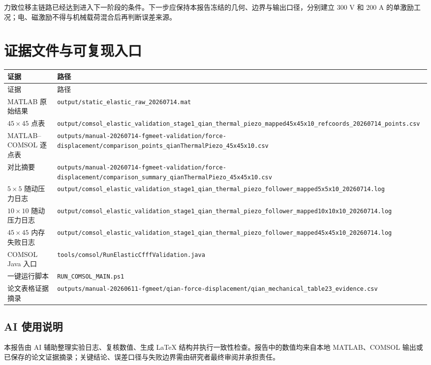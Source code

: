 \documentclass[UTF8,fontset=windows,12pt,a4paper]{ctexart}
\begin{document}
力致位移主链路已经达到进入下一阶段的条件。下一步应保持本报告冻结的几何、边界与输出口径，分别建立 300 V 和 200 A 的单激励工况；电、磁激励不得与机械载荷混合后再判断误差来源。

\section{证据文件与可复现入口}

\begin{longtable}{>{\raggedright\arraybackslash}p{}>{\raggedright\arraybackslash}p{}}
\toprule
证据 & 路径 \\
\midrule
\endfirsthead
\toprule
证据 & 路径 \\
\midrule
\endhead
MATLAB 原始结果 & \nolinkurl{output/static_elastic_raw_20260714.mat} \\
$45\times45$ 点表 & \nolinkurl{output/comsol_elastic_validation_stage1_qian_thermal_piezo_mapped45x45x10_refcoords_20260714_points.csv} \\
MATLAB--COMSOL 逐点表 & \nolinkurl{outputs/manual-20260714-fgmeet-validation/force-displacement/comparison_points_qianThermalPiezo_45x45x10.csv} \\
对比摘要 & \nolinkurl{outputs/manual-20260714-fgmeet-validation/force-displacement/comparison_summary_qianThermalPiezo_45x45x10.csv} \\
$5\times5$ 随动压力日志 & \nolinkurl{output/comsol_elastic_validation_stage1_qian_thermal_piezo_follower_mapped5x5x10_20260714.log} \\
$10\times10$ 随动压力日志 & \nolinkurl{output/comsol_elastic_validation_stage1_qian_thermal_piezo_follower_mapped10x10x10_20260714.log} \\
$45\times45$ 内存失败日志 & \nolinkurl{output/comsol_elastic_validation_stage1_qian_thermal_piezo_follower_mapped45x45x10_20260714.log} \\
COMSOL Java 入口 & \nolinkurl{tools/comsol/RunElasticCfffValidation.java} \\
一键运行脚本 & \nolinkurl{RUN_COMSOL_MAIN.ps1} \\
论文表格证据摘录 & \nolinkurl{outputs/manual-20260611-fgmeet/qian-force-displacement/qian_mechanical_table23_evidence.csv} \\
\bottomrule
\end{longtable}

\subsection*{AI 使用说明}
本报告由 AI 辅助整理实验日志、复核数值、生成 LaTeX 结构并执行一致性检查。报告中的数值均来自本地 MATLAB、COMSOL 输出或已保存的论文证据摘录；关键结论、误差口径与失败边界需由研究者最终审阅并承担责任。
\end{document}

